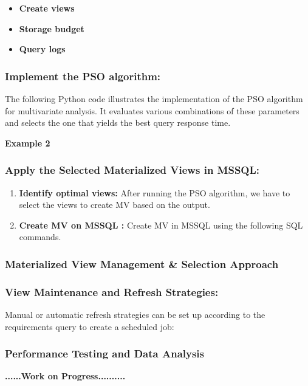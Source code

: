   \begin{itemize}
      \item \textbf{Create views}
      \item \textbf{Storage budget}
      \item \textbf{Query logs}
  \end{itemize}

  
  
\subsubsection{Implement the PSO algorithm:}
 The following Python code illustrates the implementation of the PSO algorithm for multivariate analysis. It evaluates various combinations of these parameters and selects the one that yields the best query response time.\vspace{.4cm}


  
  \vspace{.4cm}

\textbf{Example 2}
  
  
\subsubsection{Apply the Selected  Materialized Views in MSSQL:}

\begin{enumerate}
    \item \textbf{Identify optimal views:} After running the PSO algorithm, we have to select the views to create MV based on the output.
    \item \textbf{ Create MV on MSSQL :} Create MV in MSSQL using the following SQL commands.
   
    
\end{enumerate}


\subsubsection{Materialized View Management \& Selection Approach}
\subsubsection{View Maintenance and Refresh Strategies:} Manual or automatic refresh strategies can be set up according to the requirements query to create a scheduled job:



\subsubsection{Performance Testing and Data Analysis}

\textbf{......\textbf{Work on Progress}..........}       